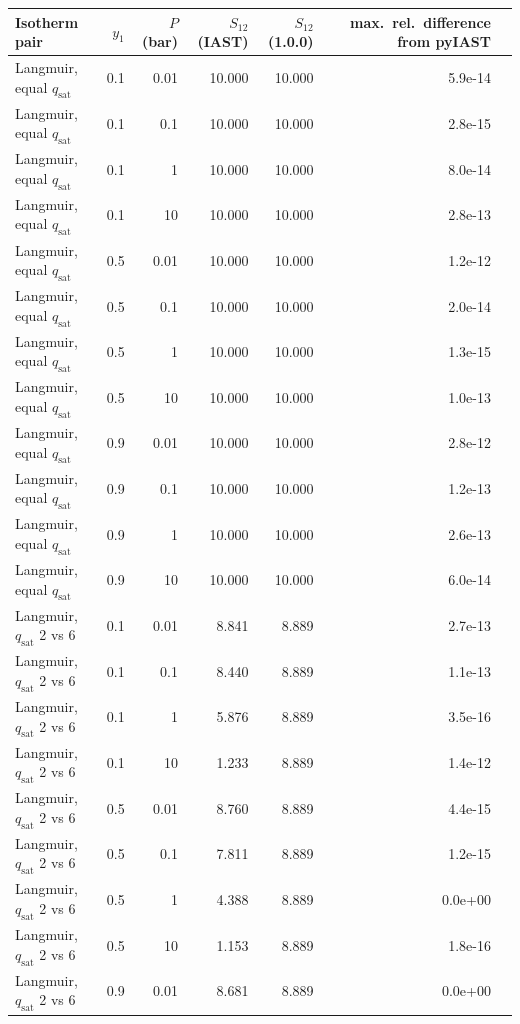 \begin{tabular}{lrrrrrr}
\toprule
Isotherm pair & $y_1$ & $P$ (bar) & $S_{12}$ (IAST) & $S_{12}$ (1.0.0) & max.\ rel.\ difference from pyIAST \\
\midrule
Langmuir, equal $q_{\mathrm{sat}}$ & 0.1 & 0.01 & 10.000 & 10.000 & 5.9e-14 \\
Langmuir, equal $q_{\mathrm{sat}}$ & 0.1 & 0.1 & 10.000 & 10.000 & 2.8e-15 \\
Langmuir, equal $q_{\mathrm{sat}}$ & 0.1 & 1 & 10.000 & 10.000 & 8.0e-14 \\
Langmuir, equal $q_{\mathrm{sat}}$ & 0.1 & 10 & 10.000 & 10.000 & 2.8e-13 \\
Langmuir, equal $q_{\mathrm{sat}}$ & 0.5 & 0.01 & 10.000 & 10.000 & 1.2e-12 \\
Langmuir, equal $q_{\mathrm{sat}}$ & 0.5 & 0.1 & 10.000 & 10.000 & 2.0e-14 \\
Langmuir, equal $q_{\mathrm{sat}}$ & 0.5 & 1 & 10.000 & 10.000 & 1.3e-15 \\
Langmuir, equal $q_{\mathrm{sat}}$ & 0.5 & 10 & 10.000 & 10.000 & 1.0e-13 \\
Langmuir, equal $q_{\mathrm{sat}}$ & 0.9 & 0.01 & 10.000 & 10.000 & 2.8e-12 \\
Langmuir, equal $q_{\mathrm{sat}}$ & 0.9 & 0.1 & 10.000 & 10.000 & 1.2e-13 \\
Langmuir, equal $q_{\mathrm{sat}}$ & 0.9 & 1 & 10.000 & 10.000 & 2.6e-13 \\
Langmuir, equal $q_{\mathrm{sat}}$ & 0.9 & 10 & 10.000 & 10.000 & 6.0e-14 \\
Langmuir, $q_{\mathrm{sat}}$ 2 vs 6 & 0.1 & 0.01 & 8.841 & 8.889 & 2.7e-13 \\
Langmuir, $q_{\mathrm{sat}}$ 2 vs 6 & 0.1 & 0.1 & 8.440 & 8.889 & 1.1e-13 \\
Langmuir, $q_{\mathrm{sat}}$ 2 vs 6 & 0.1 & 1 & 5.876 & 8.889 & 3.5e-16 \\
Langmuir, $q_{\mathrm{sat}}$ 2 vs 6 & 0.1 & 10 & 1.233 & 8.889 & 1.4e-12 \\
Langmuir, $q_{\mathrm{sat}}$ 2 vs 6 & 0.5 & 0.01 & 8.760 & 8.889 & 4.4e-15 \\
Langmuir, $q_{\mathrm{sat}}$ 2 vs 6 & 0.5 & 0.1 & 7.811 & 8.889 & 1.2e-15 \\
Langmuir, $q_{\mathrm{sat}}$ 2 vs 6 & 0.5 & 1 & 4.388 & 8.889 & 0.0e+00 \\
Langmuir, $q_{\mathrm{sat}}$ 2 vs 6 & 0.5 & 10 & 1.153 & 8.889 & 1.8e-16 \\
Langmuir, $q_{\mathrm{sat}}$ 2 vs 6 & 0.9 & 0.01 & 8.681 & 8.889 & 0.0e+00 \\

\end{tabular}
